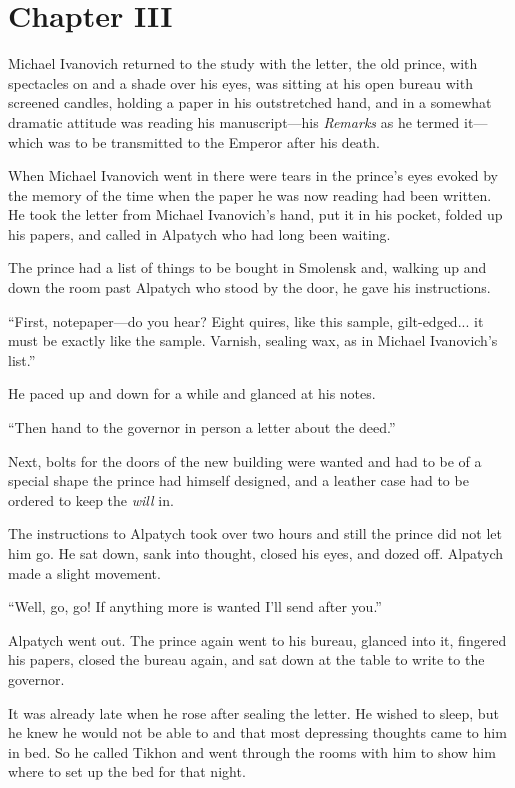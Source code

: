 \chapter*{Chapter III} \ifaudio {}
\fi

 Michael Ivanovich returned to the study with the letter, the
old prince, with spectacles on and a shade over his eyes, was
sitting at his open bureau with screened candles, holding a paper
in his outstretched hand, and in a somewhat dramatic attitude was
reading his manuscript---his \emph{Remarks} as he termed
it---which was to be transmitted to the Emperor after his death.

When Michael Ivanovich went in there were tears in the prince's
eyes evoked by the memory of the time when the paper he was now
reading had been written. He took the letter from Michael
Ivanovich's hand, put it in his pocket, folded up his papers, and
called in Alpatych who had long been waiting.

The prince had a list of things to be bought in Smolensk and,
walking up and down the room past Alpatych who stood by the door,
he gave his instructions.

``First, notepaper---do you hear? Eight quires, like this sample,
gilt-edged... it must be exactly like the sample. Varnish,
sealing wax, as in Michael Ivanovich's list.''

He paced up and down for a while and glanced at his notes.

``Then hand to the governor in person a letter about the deed.''

Next, bolts for the doors of the new building were wanted and had
to be of a special shape the prince had himself designed, and a
leather case had to be ordered to keep the \emph{will} in.

The instructions to Alpatych took over two hours and still the
prince did not let him go. He sat down, sank into thought, closed
his eyes, and dozed off. Alpatych made a slight movement.

``Well, go, go! If anything more is wanted I'll send after you.''

Alpatych went out. The prince again went to his bureau, glanced
into it, fingered his papers, closed the bureau again, and sat
down at the table to write to the governor.

It was already late when he rose after sealing the letter. He
wished to sleep, but he knew he would not be able to and that
most depressing thoughts came to him in bed. So he called Tikhon
and went through the rooms with him to show him where to set up
the bed for that night.

